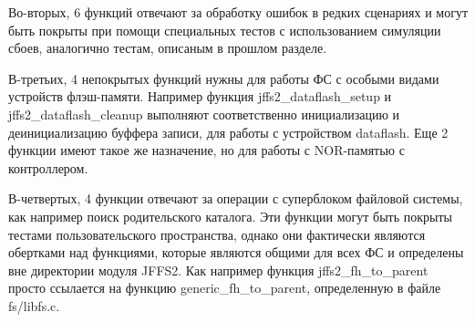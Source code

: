 Во-вторых, 6 функций отвечают за обработку ошибок в редких сценариях и могут быть покрыты при помощи специальных тестов с использованием симуляции сбоев, аналогично тестам, описаным в прошлом разделе.

В-третьих, 4 непокрытых функций нужны для работы ФС с особыми видами устройств флэш-памяти. Например функция jffs2\_dataflash\_setup и jffs2\_dataflash\_cleanup выполняют соответственно инициализацию и деинициализацию буффера записи, для работы с устройством dataflash. Еще 2 функции имеют такое же назначение, но для работы с NOR-памятью с контроллером.

В-четвертых, 4 функции отвечают за операции с суперблоком файловой системы, как например поиск родительского каталога. Эти функции могут быть покрыты тестами пользовательского пространства, однако они фактически являются обертками над функциями, которые являются общими для всех ФС и определены вне директории модуля JFFS2. Как например функция jffs2\_fh\_to\_parent просто ссылается на функцию generic\_fh\_to\_parent, определенную в файле fs/libfs.c.

\newpage
